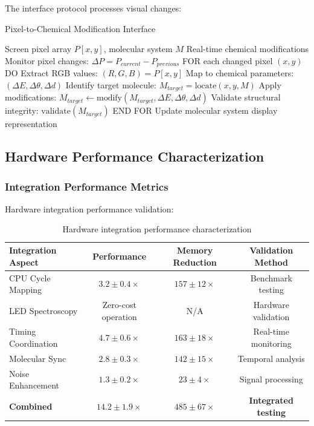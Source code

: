 \documentclass[12pt,a4paper]{article}
\begin{document}
The interface protocol processes visual changes:

\begin{algorithm}[H]
\caption{Pixel-to-Chemical Modification Interface}
\begin{algorithmic}[1]
\REQUIRE Screen pixel array $P[x,y]$, molecular system $M$
\ENSURE Real-time chemical modifications
\STATE Monitor pixel changes: $\Delta P = P_{current} - P_{previous}$
\STATE FOR each changed pixel $(x,y)$ DO
\STATE \quad Extract RGB values: $(R, G, B) = P[x,y]$
\STATE \quad Map to chemical parameters: $(\Delta E, \Delta \theta, \Delta d)$
\STATE \quad Identify target molecule: $M_{target} = \text{locate}(x, y, M)$
\STATE \quad Apply modifications: $M_{target} \leftarrow \text{modify}(M_{target}, \Delta E, \Delta \theta, \Delta d)$
\STATE \quad Validate structural integrity: $\text{validate}(M_{target})$
\STATE END FOR
\STATE Update molecular system display representation
\end{algorithmic}
\end{algorithm}

\subsection{Hardware Performance Characterization}

\subsubsection{Integration Performance Metrics}

Hardware integration performance validation:

\begin{table}[H]
\centering
\begin{tabular}{|l|c|c|c|}
\hline
\textbf{Integration Aspect} & \textbf{Performance} & \textbf{Memory Reduction} & \textbf{Validation Method} \\
\hline
CPU Cycle Mapping & $3.2 \pm 0.4 \times$ & $157 \pm 12 \times$ & Benchmark testing \\
LED Spectroscopy & Zero-cost operation & N/A & Hardware validation \\
Timing Coordination & $4.7 \pm 0.6 \times$ & $163 \pm 18 \times$ & Real-time monitoring \\
Molecular Sync & $2.8 \pm 0.3 \times$ & $142 \pm 15 \times$ & Temporal analysis \\
Noise Enhancement & $1.3 \pm 0.2 \times$ & $23 \pm 4 \times$ & Signal processing \\
\hline
\textbf{Combined} & \textbf{$14.2 \pm 1.9 \times$} & \textbf{$485 \pm 67 \times$} & \textbf{Integrated testing} \\
\hline
\end{tabular}
\caption{Hardware integration performance characterization}
\end{table}
\end{document}

